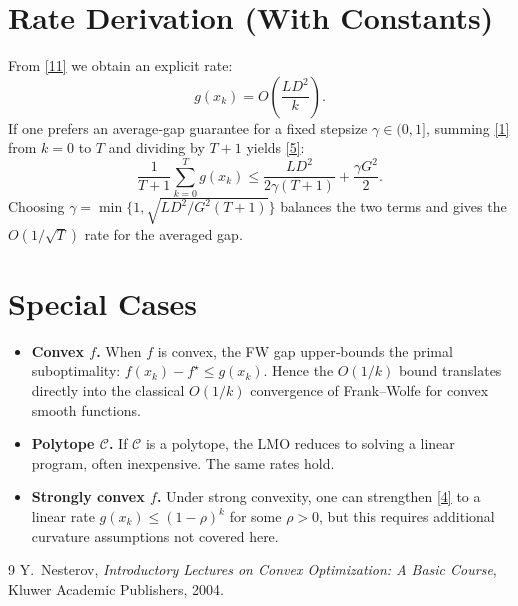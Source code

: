 \documentclass{article}
\begin{document}
\section*{Rate Derivation (With Constants)}
From \eqref{11} we obtain an explicit rate:
\[
g(x_k)=O\!\left(\frac{L D^{2}}{k}\right).
\]
If one prefers an average‑gap guarantee for a fixed stepsize $\gamma\in(0,1]$, summing \eqref{1} from $k=0$ to $T$ and dividing by $T+1$ yields \eqref{5}:
\[
\frac{1}{T+1}\sum_{k=0}^{T} g(x_k)
\le
\frac{L D^{2}}{2\gamma (T+1)}+\frac{\gamma G^{2}}{2}.
\]
Choosing $\gamma=\min\{1,\sqrt{L D^{2}/G^{2}(T+1)}\}$ balances the two terms and gives the $O(1/\sqrt{T})$ rate for the averaged gap.

\section*{Special Cases}
\begin{itemize}
\item \textbf{Convex $f$.} When $f$ is convex, the FW gap upper‑bounds the primal suboptimality: $f(x_k)-f^\star\le g(x_k)$. Hence the $O(1/k)$ bound translates directly into the classical $O(1/k)$ convergence of Frank–Wolfe for convex smooth functions.
\item \textbf{Polytope $\mathcal{C}$.} If $\mathcal{C}$ is a polytope, the LMO reduces to solving a linear program, often inexpensive. The same rates hold.
\item \textbf{Strongly convex $f$.} Under strong convexity, one can strengthen \eqref{4} to a linear rate $g(x_k)\le (1-\rho)^{k}$ for some $\rho>0$, but this requires additional curvature assumptions not covered here.
\end{itemize}

\begin{thebibliography}{9}
Y.~Nesterov,
\emph{Introductory Lectures on Convex Optimization: A Basic Course},
Kluwer Academic Publishers, 2004.
\end{thebibliography}
\end{document}
